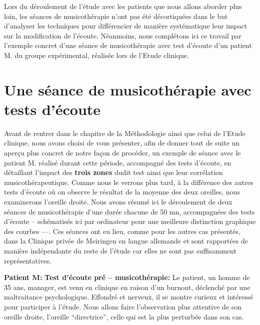 Lors du déroulement de l'étude avec les patients que nous allons aborder plus loin, les séances 
de
musicothérapie n'ont pas été
décortiquées dans le but d'analyser les techniques pour différencier de manière systématique  leur  
impact sur la 
modification de 
l'écoute.
Néanmoins, nous  complétons ici ce travail par l'exemple concret d'une  séance de
musicothérapie  avec test d'écoute  d'un 
patient M. du groupe expérimental, réalisée lors de l'Etude clinique.

 \clearpage



\section{ Une séance de musicothérapie avec tests d'écoute}

Avant de rentrer dans le chapitre de la Méthodologie ainsi que celui de l'Etude clinique, nous avons 
choisi de vous présenter,  afin de donner tout de suite un aperçu plus concret  de notre façon de 
procéder, un exemple de 
séance avec le 
patient M. réalisé durant cette 
période, accompagné des tests d'écoute, en détaillant 
l'impact
des\textbf{ trois zones} dudit test ainsi que  leur corrélation musicothérapeutique. Comme nous le 
verrons plus tard, à la différence des 
autres tests d'écoute où on observe le résultat de la moyenne des deux oreilles, nous examinerons 
l'oreille droite.
Nous avons résumé ici le déroulement de deux séances de
musicothérapie d'une durée chacune  de 50 mn,  accompagnées des tests d'écoute --  
schématisés ici  par ordinateur pour une meilleure 
distinction graphique des courbes ---. Ces séances ont eu lieu, comme pour les autres cas 
présentés, dans la Clinique privée de Meiringen en langue allemande et sont rapportées de
manière indépendante du reste de l'étude car elles ne sont pas
suffisamment représentatives.

\textbf{Patient M:}
\textbf{ Test d'écoute pré -- musicothérapie:}
Le patient, un homme de 35 ans, manager,  est venu en clinique en raison d'un burnout, déclenché par 
une maltraitance psychologique. Effondré et nerveux, il  se montre curieux et 
intéressé pour participer à l'étude. Nous allons faire
l'observation plus attentive de
son oreille droite, l'oreille ``directrice'',
celle qui est la plus perturbée dans son cas.


